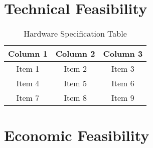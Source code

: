 \section{Technical Feasibility}
\begin{table}[h]
\caption{Hardware Specification Table}
\vspace{12pt}
\centering
\begin{tabular}{|c|c|c|}
\hline
Column 1 & Column 2 & Column 3 \\
\hline
Item 1   & Item 2   & Item 3   \\
Item 4   & Item 5   & Item 6   \\
Item 7   & Item 8   & Item 9   \\
\hline
\end{tabular}

\label{tab:Hardware Specification Table}
\end{table}
\section{Economic Feasibility}
\lipsum[4-8]

